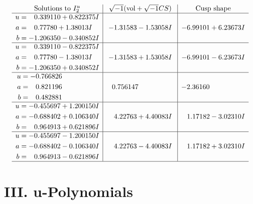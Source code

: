 \documentclass[1p]{elsarticle_modified}
\theoremstyle{definition}
\newcommand{\I}{\sqrt{-1}}
\begin{document}
$$\begin{array}{c|c|c}  
\text{Solutions to }I^u_{2}& \I (\text{vol} + \sqrt{-1}CS) & \text{Cusp shape}\\
 \hline 
\begin{aligned}
u &= \phantom{-}0.339110 + 0.822375 I \\
a &= \phantom{-}0.77780 + 1.38013 I \\
b &= -1.206350 - 0.340852 I\end{aligned}
 & -1.31583 - 1.53058 I & -6.99101 + 6.23673 I \\ \hline\begin{aligned}
u &= \phantom{-}0.339110 - 0.822375 I \\
a &= \phantom{-}0.77780 - 1.38013 I \\
b &= -1.206350 + 0.340852 I\end{aligned}
 & -1.31583 + 1.53058 I & -6.99101 - 6.23673 I \\ \hline\begin{aligned}
u &= -0.766826\phantom{ +0.000000I} \\
a &= \phantom{-}0.821196\phantom{ +0.000000I} \\
b &= \phantom{-}0.482881\phantom{ +0.000000I}\end{aligned}
 & \phantom{-}0.756147\phantom{ +0.000000I} & -2.36160\phantom{ +0.000000I} \\ \hline\begin{aligned}
u &= -0.455697 + 1.200150 I \\
a &= -0.688402 + 0.106340 I \\
b &= \phantom{-}0.964913 + 0.621896 I\end{aligned}
 & \phantom{-}4.22763 + 4.40083 I & \phantom{-}1.17182 - 3.02310 I \\ \hline\begin{aligned}
u &= -0.455697 - 1.200150 I \\
a &= -0.688402 - 0.106340 I \\
b &= \phantom{-}0.964913 - 0.621896 I\end{aligned}
 & \phantom{-}4.22763 - 4.40083 I & \phantom{-}1.17182 + 3.02310 I\\
 \hline 
 \end{array}$$\newpage
\newpage\renewcommand{\arraystretch}{1}
\centering \section*{ III. u-Polynomials}
\end{document}
